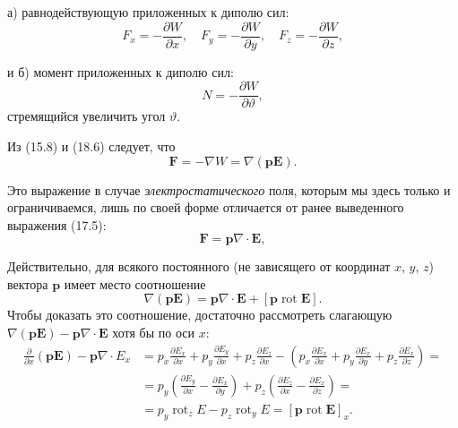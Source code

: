 \documentclass[a4paper,10pt]{article}
\begin{document}
а) равнодействующую приложенных к диполю сил:
\begin{equation}
    F_x = -\frac{\partial W}{\partial x},
    \quad
    F_y = -\frac{\partial W}{\partial y},
    \quad
    F_z = -\frac{\partial W}{\partial z},
    \tag{18.6}
\end{equation}

и б) момент приложенных к диполю сил:
\begin{equation}
    N = -\frac{\partial W}{\partial\vartheta},
    \tag{18.7}
\end{equation}
стремящийся увеличить угол $\vartheta$.

Из (15.8) и (18.6) следует, что
\begin{equation}
    \mathbf{F} = -\nabla W = \nabla(\mathbf{p}\mathbf{E}).
    \tag{18.8}
\end{equation}

Это выражение в случае \textit{электростатического} поля, которым
мы здесь только и ограничиваемся, лишь по своей форме отличается
от ранее выведенного выражения (17.5):
$$
    \mathbf{F} = \mathbf{p}\nabla\cdot\mathbf{E},
$$


Действительно, для всякого постоянного (не зависящего от координат
$x$, $y$, $z$) вектора $\mathbf{p}$ имеет место соотношение
\begin{equation}
    \nabla(\mathbf{p}\mathbf{E}) = \mathbf{p}\nabla\cdot\mathbf{E}
    + [\mathbf{p}\operatorname{rot}\mathbf{E}].
    \tag{18.9}
\end{equation}
Чтобы доказать это соотношение, достаточно рассмотреть слагающую
$\nabla(\mathbf{p}\mathbf{E}) - \mathbf{p}\nabla\cdot\mathbf{E}$ хотя
бы по оси $x$:
\begin{align*}
    \frac{\partial}{\partial x}(\mathbf{p}\mathbf{E}) - \mathbf{p}\nabla\cdot E_x
    &= p_x\frac{\partial E_x}{\partial x}
     + p_y\frac{\partial E_y}{\partial x}
     + p_z\frac{\partial E_z}{\partial x}
     - \left(p_x\frac{\partial E_x}{\partial x}
           + p_y\frac{\partial E_x}{\partial y}
           + p_z\frac{\partial E_x}{\partial z}\right) = \\
    &= p_y\!\left(\frac{\partial E_y}{\partial x} - \frac{\partial E_x}{\partial y}\right)
     + p_z\!\left(\frac{\partial E_z}{\partial x} - \frac{\partial E_x}{\partial z}\right) = \\
    &= p_y\operatorname{rot}_z E - p_z\operatorname{rot}_y E
     = [\mathbf{p}\operatorname{rot}\mathbf{E}]_x.
\end{align*}
\end{document}
